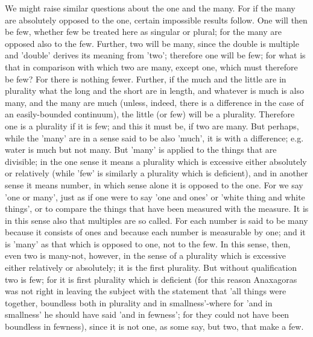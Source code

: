 We might raise similar questions about the one and the many. For if the many are absolutely opposed to the one, certain impossible results follow. One will then be few, whether few be treated here as singular or plural; for the many are opposed also to the few. Further, two will be many, since the double is multiple and 'double' derives its meaning from 'two'; therefore one will be few; for what is that in comparison with which two are many, except one, which must therefore be few? For there is nothing fewer. Further, if the much and the little are in plurality what the long and the short are in length, and whatever is much is also many, and the many are much (unless, indeed, there is a difference in the case of an easily-bounded continuum), the little (or few) will be a plurality. Therefore one is a plurality if it is few; and this it must be, if two are many. But perhaps, while the 'many' are in a sense said to be also 'much', it is with a difference; e.g. water is much but not many. But 'many' is applied to the things that are divisible; in the one sense it means a plurality which is excessive either absolutely or relatively (while 'few' is similarly a plurality which is deficient), and in another sense it means number, in which sense alone it is opposed to the one. For we say 'one or many', just as if one were to say 'one and ones' or 'white thing and white things', or to compare the things that have been measured with the measure. It is in this sense also that multiples are so called. For each number is said to be many because it consists of ones and because each number is measurable by one; and it is 'many' as that which is opposed to one, not to the few. In this sense, then, even two is many-not, however, in the sense of a plurality which is excessive either relatively or absolutely; it is the first plurality. But without qualification two is few; for it is first plurality which is deficient (for this reason Anaxagoras was not right in leaving the subject with the statement that 'all things were together, boundless both in plurality and in smallness'-where for 'and in smallness' he should have said 'and in fewness'; for they could not have been boundless in fewness), since it is not one, as some say, but two, that make a few.

